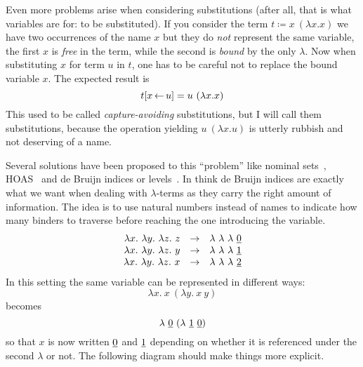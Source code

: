 Even more problems arise when considering substitutions (after all, that is what
variables are for: to be substituted).
If you consider the term \(t \coloneqq x\ (\lambda x. x)\) we have two
occurrences of the name \(x\) but they do \emph{not} represent the same
variable, the first \(x\) is \emph{free} in the term, while the second is
\emph{bound} by the only \(\lambda\).
Now when substituting \(x\) for term \(u\) in \(t\), one has to be careful not
to replace the bound variable \(x\). The expected result is
\[
  t[x \sto u] = u\ (\lambda x. x)
\]
This used to be called \emph{capture-avoiding} substitutions, but I will call
them substitutions, because the operation yielding \(u\ (\lambda x. u)\)
is utterly rubbish and not deserving of a name.

Several solutions have been proposed to this ``problem'' like nominal
sets~,
\acrfull{HOAS}~ and de Bruijn indices or
levels~.
In think de Bruijn indices are exactly what we want when dealing with
\(\lambda\)-terms as they carry the right amount of information.
The idea is to use natural numbers instead of names to indicate how many binders
to traverse before reaching the one introducing the variable.
\[
  \begin{array}{rcl}
    \lambda x.\ \lambda y.\ \lambda z.\ z
    &\to& \lambda\ \lambda\ \lambda\ \underline{0} \\
    \lambda x.\ \lambda y.\ \lambda z.\ y
    &\to& \lambda\ \lambda\ \lambda\ \underline{1} \\
    \lambda x.\ \lambda y.\ \lambda z.\ x
    &\to& \lambda\ \lambda\ \lambda\ \underline{2}
  \end{array}
\]
In this setting the same variable can be represented in different ways:
\[
  \lambda x.\ x\ (\lambda y.\ x\ y)
\]
becomes
\[
  \lambda\ \db{0}\ (\lambda\ \db{1}\ \db{0})
\]
so that \(x\) is now written \(\underline{0}\) and \(\underline{1}\) depending on whether it
is referenced under the second \(\lambda\) or not.
The following diagram should make things more explicit.

\begin{center}
\end{center}

